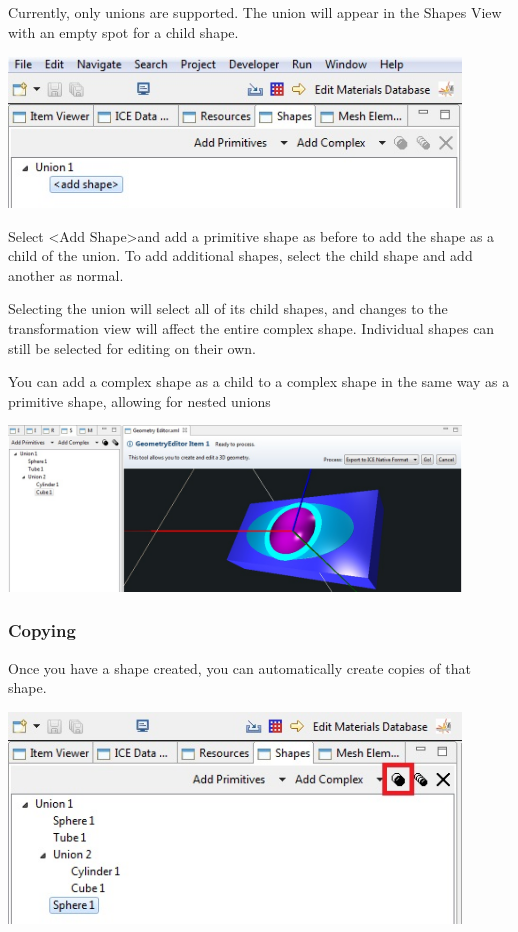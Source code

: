Currently, only unions are supported. The union will appear in the Shapes View
with an empty spot for a child shape. 

\begin{center}
\includegraphics[width=12cm]{images/GeometryUnionAddShape.jpg}
\end{center}

Select \textless Add Shape\textgreater and add a primitive shape as before to
add the shape as a child of the union. To add additional shapes, select the
child shape and add another as normal.

Selecting the union will select all of its child shapes, and changes to the
transformation view will affect the entire complex shape. Individual shapes can
still be selected for editing on their own.

You can add a complex shape as a child to a complex shape in the same way as a
primitive shape, allowing for nested unions

\begin{center}
\includegraphics[width=12cm]{images/GeometryStackedUnions.jpg}
\end{center}

\subsubsection{Copying}

Once you have a shape created, you can automatically create copies of that
shape. 

\begin{center}
\includegraphics[width=12cm]{images/GeometryDuplicateShape.jpg}
\end{center}

